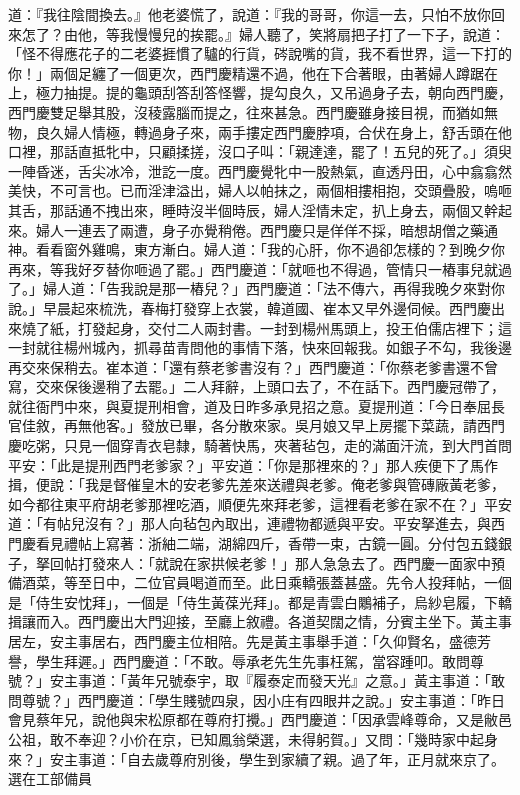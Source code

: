 \begin{showcontents}{}
道：『我往陰間換去。』他老婆慌了，說道：『我的哥哥，你這一去，只怕不放你回來怎了？由他，等我慢慢兒的挨罷。』婦人聽了，笑將扇把子打了一下子，說道：「怪不得應花子的二老婆捱慣了驢的行貨，硶說嘴的貨，我不看世界，這一下打的你！」兩個足纏了一個更次，西門慶精還不過，他在下合著眼，由著婦人蹲踞在上，極力抽提。提的龜頭刮答刮答怪響，提勾良久，又吊過身子去，朝向西門慶，西門慶雙足舉其股，沒稜露腦而提之，往來甚急。西門慶雖身接目視，而猶如無物，良久婦人情極，轉過身子來，兩手摟定西門慶脖項，合伏在身上，舒舌頭在他口裡，那話直抵牝中，只顧揉搓，沒口子叫：「親達達，罷了！五兒的死了。」須臾一陣昏迷，舌尖冰冷，泄訖一度。西門慶覺牝中一股熱氣，直透丹田，心中翕翕然美快，不可言也。已而淫津溢出，婦人以帕抹之，兩個相摟相抱，交頭疊股，嗚咂其舌，那話通不拽出來，睡時沒半個時辰，婦人淫情未定，扒上身去，兩個又幹起來。婦人一連丟了兩遭，身子亦覺稍倦。西門慶只是佯佯不採，暗想胡僧之藥通神。看看窗外雞鳴，東方漸白。婦人道：「我的心肝，你不過卻怎樣的？到晚夕你再來，等我好歹替你咂過了罷。」西門慶道：「就咂也不得過，管情只一樁事兒就過了。」婦人道：「告我說是那一樁兒？」西門慶道：「法不傳六，再得我晚夕來對你說。」早晨起來梳洗，春梅打發穿上衣裳，韓道國、崔本又早外邊伺候。西門慶出來燒了紙，打發起身，交付二人兩封書。一封到楊州馬頭上，投王伯儒店裡下；這一封就往楊州城內，抓尋苗青問他的事情下落，快來回報我。如銀子不勾，我後邊再交來保稍去。崔本道：「還有蔡老爹書沒有？」西門慶道：「你蔡老爹書還不曾寫，交來保後邊稍了去罷。」二人拜辭，上頭口去了，不在話下。西門慶冠帶了，就往衙門中來，與夏提刑相會，道及日昨多承見招之意。夏提刑道：「今日奉屈長官佳敘，再無他客。」發放已畢，各分散來家。吳月娘又早上房擺下菜蔬，請西門慶吃粥，只見一個穿青衣皂隸，騎著快馬，夾著毡包，走的滿面汗流，到大門首問平安：「此是提刑西門老爹家？」平安道：「你是那裡來的？」那人疾便下了馬作揖，便說：「我是督催皇木的安老爹先差來送禮與老爹。俺老爹與管磚廠黃老爹，如今都往東平府胡老爹那裡吃酒，順便先來拜老爹，這裡看老爹在家不在？」平安道：「有帖兒沒有？」那人向毡包內取出，連禮物都遞與平安。平安拏進去，與西門慶看見禮帖上寫著：浙紬二端，湖綿四斤，香帶一束，古鏡一圓。分付包五錢銀子，拏回帖打發來人：「就說在家拱候老爹！」那人急急去了。西門慶一面家中預備酒菜，等至日中，二位官員喝道而至。此日乘轎張蓋甚盛。先令人投拜帖，一個是「侍生安忱拜」，一個是「侍生黃葆光拜」。都是青雲白鷴補子，烏紗皂履，下轎揖讓而入。西門慶出大門迎接，至廳上敘禮。各道契闊之情，分賓主坐下。黃主事居左，安主事居右，西門慶主位相陪。先是黃主事舉手道：「久仰賢名，盛德芳譽，學生拜遲。」西門慶道：「不敢。辱承老先生先事枉駕，當容踵叩。敢問尊號？」安主事道：「黃年兄號泰宇，取『履泰定而發天光』之意。」黃主事道：「敢問尊號？」西門慶道：「學生賤號四泉，因小庄有四眼井之說。」安主事道：「昨日會見蔡年兄，說他與宋松原都在尊府打攪。」西門慶道：「因承雲峰尊命，又是敝邑公祖，敢不奉迎？小价在京，已知鳳翁榮選，未得躬賀。」又問：「幾時家中起身來？」安主事道：「自去歲尊府別後，學生到家續了親。過了年，正月就來京了。選在工部備員
\end{showcontents}
